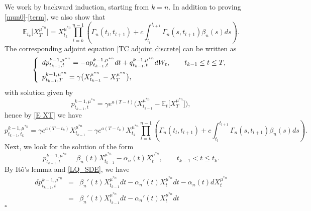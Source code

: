 \documentclass[12pt]{article}
\theoremstyle{named}
\numberwithin{equation}{section}
\newenvironment{Proof}{\removelastskip\par\medskip \noindent{\em Proof.} \rm}{\penalty-20\null\hfill$\square$\par\medbreak}
\newcommand{\E}{\mathbb{E}}
\begin{document}
\begin{Proof}
      We work by backward induction, starting from $k=n$.
  In addition to proving \eqref{mun0}-\eqref{term}, we also show that
    \begin{equation}
        \label{E XT}
        \E_{t_k} \big[ X^{\mu^{*n} }_T \big] = X^{\mu^{*n} }_{t_k} \prod\limits_{l=k}^{n-1}\left( \Gamma_n (t_l, t_{l+1}) + c \int_{t_l}^{t_{l+1}} \Gamma_n (s, t_{l+1})\beta_n(s) ds \right).
    \end{equation}
 The corresponding adjoint equation \eqref{TC adjoint discrete} can be written as
\begin{equation}
  \label{LQ bsde}
  \left\{
  \begin{array}{l}
    \displaystyle
    dp^{k-1,\mu^{*n} }_{t_{k-1},t} = -ap^{k-1,\mu^{*n} }_{t_{k-1},t} dt + q^{k-1,\mu^{*n} }_{t_{k-1},t} dW_t, \qquad t_{k-1} \leq t \leq T ,
\medskip
 \\
    \displaystyle
    p^{k-1,\mu^{*n} }_{t_{k-1},T} = \gamma \big(X^{\mu^{*n} }_{t_{k-1}} - X^{\mu^{*n} }_T\big),
  \end{array}
  \right.
\end{equation}
 with solution given by
\begin{equation}
\nonumber %
    p^{k-1,\mu^{*n} }_{t_{k-1},t} = \gamma e^{a(T-t)}\big(X^{\mu^{*n} }_{t_{k-1}} - \E_t\big[ X^{\mu^{*n} }_T\big] \big),
\end{equation}
hence by \eqref{E XT} we have
\begin{equation}
    \label{lq bsde terminal cond tk}
    p^{k-1,\mu^{*n} }_{t_{k-1},t_k} = \gamma e^{a(T-t_k)}X^{\mu^{*n} }_{t_{k-1}} - \gamma e^{a(T-t_k)}
    X^{\mu^{*n} }_{t_k}
    \prod\limits_{l=k}^{n-1}\left( \Gamma_n (t_l, t_{l+1}) + c \int_{t_l}^{t_{l+1}} \Gamma_n (s, t_{l+1})\beta_n(s) ds \right).
\end{equation}
 Next, we look for the solution of the form
\begin{equation}
  \label{dflksf1}
  p^{k-1,\mu^{*n} }_{t_{k-1},t} = \beta_n (t) X^{\mu^{*n} }_{t_{k-1}} - \alpha_n (t) X^{\mu^{*n} }_{t},
 \qquad t_{k-1} < t \leq t_k .
  \end{equation}
 By It\^o's lemma and \eqref{LQ_SDE}, we have
\begin{eqnarray*}
  dp^{k-1,\mu^{*n} }_{t_{k-1},t} & = &
  \beta_n' (t) X^{\mu^{*n} }_{t_{k-1}} dt
 - \alpha_n' (t) X^{\mu^{*n} }_{t} dt
 - \alpha_n (t) dX^{\mu^{*n} }_{t}
 \\
 & = &
  \beta_n' (t) X^{\mu^{*n} }_{t_{k-1}} dt
 - \alpha_n' (t) X^{\mu^{*n} }_{t} dt

\end{eqnarray*}
\end{Proof}
\end{document}
